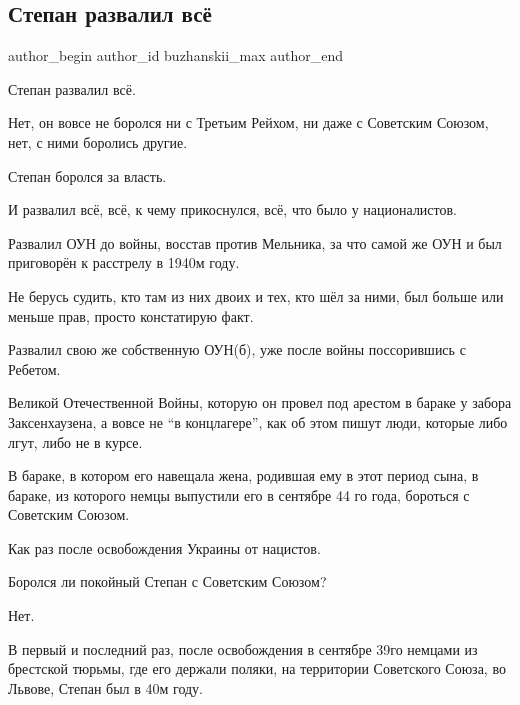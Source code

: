  
 
 
 
 
 
\subsection{Степан развалил всё}
\label{sec:01_01_2022.fb.buzhanskii_max.1.stepan_razvalil_vse}
 
\ifcmt
 author_begin
   author_id buzhanskii_max
 author_end
\fi

Степан развалил всё.

Нет, он вовсе не боролся ни с Третьим Рейхом, ни даже с Советским Союзом, нет,
с ними боролись другие.

Степан боролся за власть.

И развалил всё, всё, к чему прикоснулся, всё, что было у националистов.

Развалил ОУН до войны, восстав против Мельника, за что самой же ОУН и был
приговорён к расстрелу в 1940м году.

Не берусь судить, кто там из них двоих и тех, кто шёл за ними, был больше или
меньше прав, просто констатирую факт.

Развалил свою же собственную ОУН(б), уже после войны поссорившись с Ребетом.

Великой Отечественной Войны, которую он провел под арестом в бараке у забора
Заксенхаузена, а вовсе не \enquote{в концлагере}, как об этом пишут люди, которые либо
лгут, либо не в курсе.

В бараке, в котором его навещала жена, родившая ему в этот период сына, в
бараке, из которого немцы выпустили его в сентябре 44 го года, бороться с
Советским Союзом.

Как раз после освобождения Украины от нацистов.

Боролся ли покойный Степан с Советским Союзом?

Нет.

В первый и последний раз, после освобождения в сентябре 39го немцами из
брестской тюрьмы, где его держали поляки, на территории Советского Союза, во
Львове, Степан был в 40м году.

